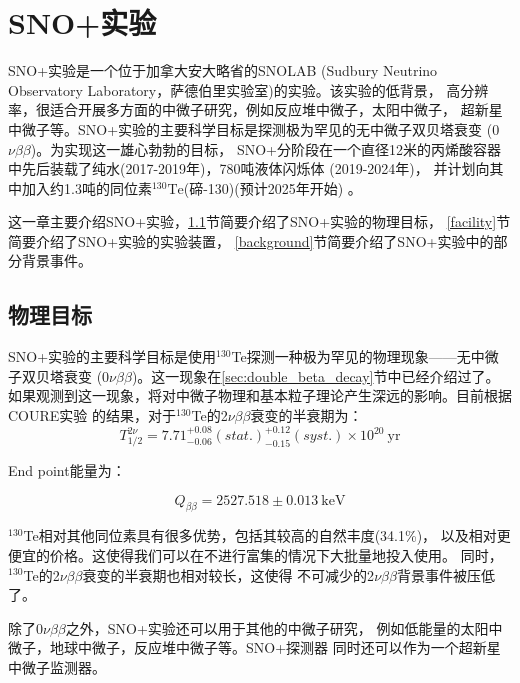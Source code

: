 \chapter{SNO+实验}

SNO+实验是一个位于加拿大安大略省的SNOLAB
(Sudbury Neutrino Observatory Laboratory，萨德伯里实验室)的实验。该实验的低背景，
高分辨率，很适合开展多方面的中微子研究，例如反应堆中微子，太阳中微子，
超新星中微子等。SNO+实验的主要科学目标是探测极为罕见的无中微子双贝塔衰变
(0$\nu\beta\beta$)。为实现这一雄心勃勃的目标，
SNO+分阶段在一个直径12米的丙烯酸容器中先后装载了纯水(2017-2019年)，780吨液体闪烁体
(2019-2024年)，
并计划向其中加入约1.3吨的同位素$^{130}\mathrm{Te}$(碲-130)(预计2025年开始)
\cite{andringa2016current}。

这一章主要介绍SNO+实验，\ref{goal}节简要介绍了SNO+实验的物理目标，
\ref{facility}节简要介绍了SNO+实验的实验装置，
\ref{background}节简要介绍了SNO+实验中的部分背景事件。

\section{物理目标}\label{goal}

SNO+实验的主要科学目标是使用${}^{130}$Te探测一种极为罕见的物理现象——无中微子双贝塔衰变
(0$\nu\beta\beta$)。这一现象在\ref{sec:double_beta_decay}节中已经介绍过了。
如果观测到这一现象，将对中微子物理和基本粒子理论产生深远的影响。目前根据COURE实验
的结果，对于${}^{130}$Te的2$\nu\beta\beta$衰变的半衰期为：\cite{PhysRevLett.126.171801}
\begin{equation}
    T_{1/2}^{2\nu} = 7.71^{+0.08}_{-0.06}(stat.)^{+0.12}_{-0.15}(syst.)\times10^{20}~\mathrm{yr}
    \label{eq:2vbb}
\end{equation}

End point能量为：\cite{PhysRevC.80.025501}

\begin{equation}
    Q_{\beta\beta} = 2527.518 \pm 0.013~\mathrm{keV}
    \label{eq:Qbb}
\end{equation}

${}^{130}$Te相对其他同位素具有很多优势，包括其较高的自然丰度(34.1\%)，
以及相对更便宜的价格。这使得我们可以在不进行富集的情况下大批量地投入使用。
同时，${}^{130}$Te的2$\nu\beta\beta$衰变的半衰期也相对较长，这使得
不可减少的2$\nu\beta\beta$背景事件被压低了。

除了0$\nu\beta\beta$之外，SNO+实验还可以用于其他的中微子研究，
例如低能量的太阳中微子，地球中微子，反应堆中微子等。SNO+探测器
同时还可以作为一个超新星中微子监测器。

